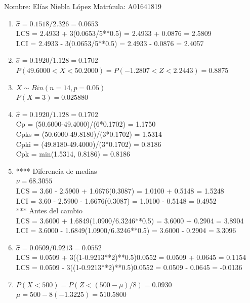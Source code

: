 \documentclass[8pt]{report}
\begin{document}
Nombre: \underline{\hspace*{.2in}}
Elías Niebla López
\underline{\hspace*{.2in}} \quad Matr\'icula:\underline{\hspace*{.2in}}
A01641819
\underline{\hspace*{.2in}} \\

\begin{enumerate}
\item $\hat\sigma = 0.1518/2.326 = 0.0653$\\
LCS = 2.4933 + 3(0.0653/5**0.5) = 2.4933 + 0.0876 = 2.5809\\
LCI = 2.4933 - 3(0.0653/5**0.5) = 2.4933 - 0.0876 = 2.4057
\item $\hat\sigma = 0.1920/1.128 = 0.1702$\\
$P(49.6000 < X < 50.2000) = P(-1.2807 < Z < 2.2443) = 0.8875$\\
\item $X \sim Bin(n=14, p=0.05)$\\
$P(X = 3) = 0.025880$
\item $\hat\sigma = 0.1920/1.128 = 0.1702$\\
Cp = (50.6000-49.4000)/(6*0.1702) = 1.1750\\
Cpks = (50.6000-49.8180)/(3*0.1702) = 1.5314\\
Cpki = (49.8180-49.4000)/(3*0.1702) = 0.8186\\
Cpk = min(1.5314, 0.8186) = 0.8186
\item **** Diferencia de medias\\
$\nu = 68.3055$\\
LCS = 3.60 - 2.5900 + 1.6676(0.3087) = 1.0100 + 0.5148 = 1.5248\\
LCI = 3.60 - 2.5900 - 1.6676(0.3087) = 1.0100 - 0.5148 = 0.4952\\
*** Antes del cambio\\
LCS = 3.6000 + 1.6849(1.0900/6.3246**0.5) = 3.6000 + 0.2904 = 3.8904\\
LCI = 3.6000 - 1.6849(1.0900/6.3246**0.5) = 3.6000 - 0.2904 = 3.3096\\
\item $\hat\sigma = 0.0509/0.9213 = 0.0552$\\
LCS = 0.0509 + 3((1-0.9213**2)**0.5)0.0552 = 0.0509 + 0.0645 = 0.1154\\
LCS = 0.0509 - 3((1-0.9213**2)**0.5)0.0552 = 0.0509 - 0.0645 = -0.0136
\item $P(X < 500) = P(Z < (500-\mu)/8) = 0.0930$\\
$\mu = 500 - 8(-1.3225) = 510.5800$\\
\end{enumerate}
\end{document}
